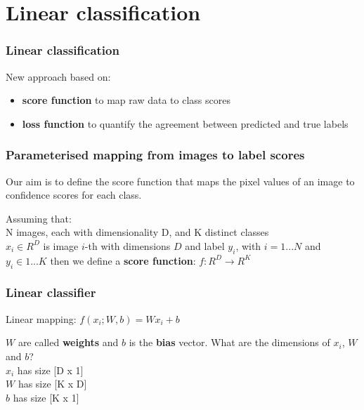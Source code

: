 
\section{Linear classification}

\begin{frame}
	\frametitle{Linear classification}
	
	New approach based on:
	\begin{itemize}
		\item \textbf{score function} to map raw data to class scores
		\item \textbf{loss function} to quantify the agreement between predicted and true labels
	\end{itemize}

\end{frame}

\begin{frame}
	\frametitle{Parameterised mapping from images to label scores}

	Our aim is to define the score function that maps the pixel values of an image to confidence scores for each class.

	\vskip 1cm

	Assuming that:\\
	\centering
	N images, each with dimensionality D, and K distinct classes\\
	$x_i \in R^D$ is image $i$-th with dimensions $D$ and label $y_i$,
	with $i = 1 ... N$ and $y_i \in 1 ... K$
	\vskip 1cm
	then we define a \textbf{score function}: $f: R^D \rightarrow R^K$

\end{frame}

\begin{frame}
        \frametitle{Linear classifier}

	Linear mapping:
	\centering
	$f(x_i; W, b) = W x_i + b$

	\vskip 1cm

	$W$ are called \textbf{weights} and $b$ is the \textbf{bias} vector.
	\vskip 0.5cm
	What are the dimensions of $x_i$, $W$ and $b$?\\

	\pause
	$x_i$ has size [D x 1]\\
	$W$ has size [K x D]\\
	$b$ has size [K x 1]
	

\end{frame}

